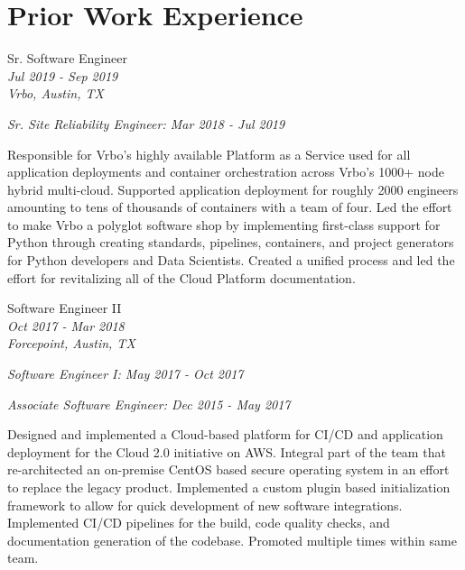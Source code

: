 \documentclass[10pt]{article} %
\begin{document}
\begin{minipage}[t]{0.5\textwidth} %
\vspace{0pt} %
\section{Prior Work Experience} 


{\raggedright\large Sr. Software Engineer\\
\small \textit{Jul 2019 - Sep 2019}\\
\small \textit{Vrbo, Austin, TX} \\
\raggedright\small \textit{Sr. Site Reliability Engineer: Mar 2018 - Jul 2019}\\[5pt]}

\normalsize{Responsible for Vrbo's highly available Platform as a Service used for all application deployments and container orchestration across Vrbo's 1000+ node hybrid multi-cloud. Supported application deployment for roughly 2000 engineers amounting to tens of thousands of containers with a team of four. Led the effort to make Vrbo a polyglot software shop by implementing first-class support for Python through creating standards, pipelines, containers, and project generators for Python developers and Data Scientists. Created a unified process and led the effort for revitalizing all of the Cloud Platform documentation. }\\

{
\raggedright\large  Software Engineer II\\
\small \textit{Oct 2017 - Mar 2018}\\
\small \textit{Forcepoint, Austin, TX}\\
\raggedright\small \textit{Software Engineer I: May 2017 - Oct 2017}\\
\raggedright\small \textit{Associate Software Engineer: Dec 2015 - May 2017}\\
[5pt]
}

\normalsize{Designed and implemented a Cloud-based platform for CI/CD and application deployment for the Cloud 2.0 initiative on AWS. Integral part of the team that re-architected an on-premise CentOS based secure operating system in an effort to replace the legacy product. Implemented a custom plugin based initialization framework to allow for quick development of new software integrations. Implemented CI/CD pipelines for the build, code quality checks, and documentation generation of the codebase. Promoted multiple times within same team.}\\


\end{minipage}
\end{document}
